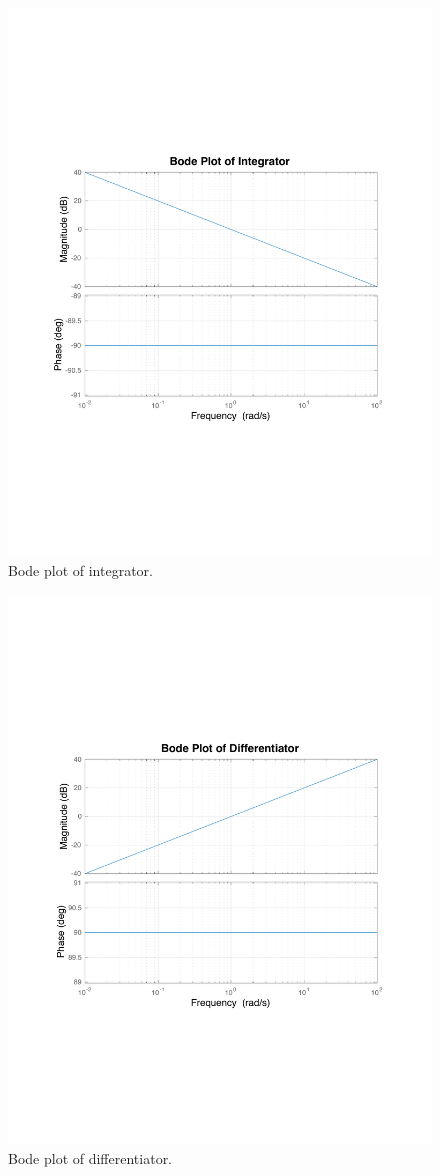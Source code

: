 \documentclass[fleqn,10pt]{olplainarticle}
\begin{document}
\begin{figure}[H]
\centering
\includegraphics[width=0.8\linewidth]{figures/Integrator.pdf}
\caption{Bode plot of integrator.}
\label{fig_bode_integrator}
\end{figure}

\begin{figure}[H]
\centering
\includegraphics[width=0.8\linewidth]{figures/Differentiator.pdf}
\caption{Bode plot of differentiator.}
\label{fig_bode_differentiator}
\end{figure}
\end{document}
